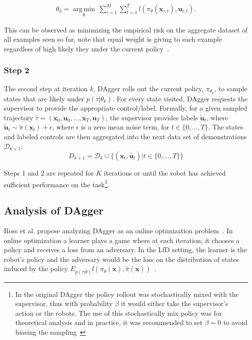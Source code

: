 \documentclass[10pt, conference]{ieeeconf}      %
\DeclareMathOperator*{\argmin}{arg\,min}
\newcommand{\bu}{\mathbf{u}}
\newcommand{\bx}{\mathbf{x}}
\begin{document}
 \vspace{-1ex}
\begin{align}\label{eq:super_objj}
\theta_{k} = \underset{\theta}{\argmin} \: \sum_{i=1}^{M} \sum_{t=1}^T  l(\pi_{\theta}(\bx_{i,t}),\bu_{i,t}).
\end{align}

This can be observed as minimizing the empirical risk on the aggregate dataset of all examples seen so far, note that equal weight is giving to each example regardless of high likely they under the current policy~\cite{scholkopf2002learning}. 
 

 \subsubsection{Step 2}
The second step at iteration $k$, DAgger rolls out the current policy, $\pi_{\theta_{k}}$, to sample states that are likely under $p(\tau|\theta_{k})$.  For every state visited, DAgger requests the supervisor to provide the appropriate control/label. Formally, for a given sampled trajectory  $\hat{\tau} = (\bx_0,\bu_0,...,\bx_T,\bu_T )$, the supervisor provides labels $\tilde{\bu}_t$, where $\tilde{\bu}_t \sim \tilde{\pi}(\bx_t) + \epsilon$, where $\epsilon$ is a  zero mean noise term, for $t\in \{0, \ldots, T\}$.
The states and labeled controls are then aggregated into the next data set of demonstrations $\mathcal{D}_{k+1}$:
$$D_{k+1}=\mathcal{D}_k \cup \{(\bx_t,\tilde{\bu_t})|t\in\{0,\ldots,T\}\} $$

Steps 1 and 2 are repeated for $K$ iterations or until the robot has achieved sufficient performance on the
task\footnote{In the original DAgger the policy rollout was stochastically mixed with the supervisor, thus with
    probability $\beta$ it would either take the supervisor's action or the robots. The use of this stochastically mix
    policy was for theoretical analysis and in practice, it was recommended to set $\beta = 0$ to avoid biasing the
sampling~\cite{NIPS2014_5421,ross2010reduction}}.

\subsection{Analysis of DAgger}
Ross et al. propose analyzing DAgger as an online optimization problem~\cite{ross2010reduction}.  In online optimization a learner plays a game where at each iteration, it chooses a policy and receives a loss from an adversary.  In the LfD setting, the learner is the robot's policy and the adversary would be the loss on the distribution of states induced by the policy $E_{p(\tau|\theta)} l(\pi_{\theta}(\bx),\tilde{\pi}(\bx))$~\cite{shalev2011online}.
\end{document}
